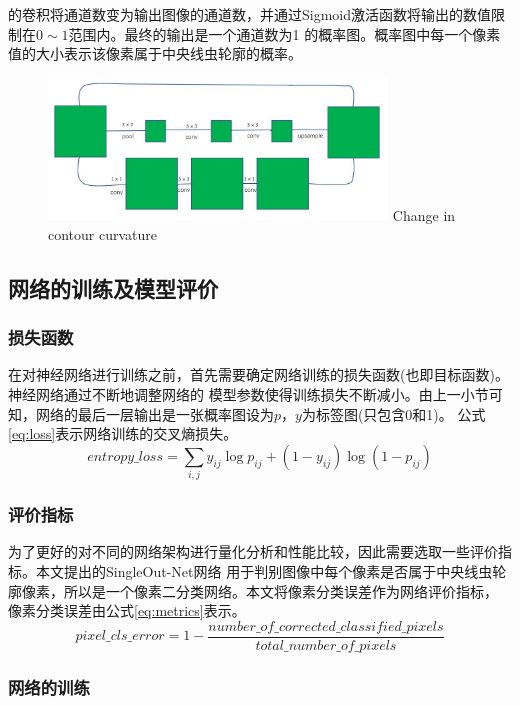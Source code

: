 	的卷积将通道数变为输出图像的通道数，并通过Sigmoid激活函数将输出的数值限制在$0\sim1$范围内。最终的输出是一个通道数为1
	的概率图。概率图中每一个像素值的大小表示该像素属于中央线虫轮廓的概率。
\begin{figure}[htb]
	  \centering
	  \includegraphics[width=9cm]{figure/chap4/residualpooling.jpg}
		{Change in contour curvature}
	  \label{fig:chap4:respool}
	\end{figure}
\subsection{网络的训练及模型评价}
\subsubsection{损失函数}
	在对神经网络进行训练之前，首先需要确定网络训练的损失函数(也即目标函数)。神经网络通过不断地调整网络的
	模型参数使得训练损失不断减小。由上一小节可知，网络的最后一层输出是一张概率图设为$p$，$y$为标签图(只包含0和1)。
	公式\ref{eq:loss}表示网络训练的交叉熵损失。
	\begin{equation}
		entropy\_loss = \sum_{i,j}y_{ij}\log p_{ij} + (1-y_{ij})\log (1-p_{ij}) \label{eq:loss}
	\end{equation}
\subsubsection{评价指标}
	为了更好的对不同的网络架构进行量化分析和性能比较，因此需要选取一些评价指标。本文提出的SingleOut-Net网络
	用于判别图像中每个像素是否属于中央线虫轮廓像素，所以是一个像素二分类网络。本文将像素分类误差作为网络评价指标，
	像素分类误差由公式\ref{eq:metrics}表示。
	\begin{equation}
		pixel\_cls\_error =1- \frac{number\_of\_corrected\_classified\_pixels}{total\_number\_of\_pixels} \label{eq:metrics}
	\end{equation}
\subsubsection{网络的训练}
	
